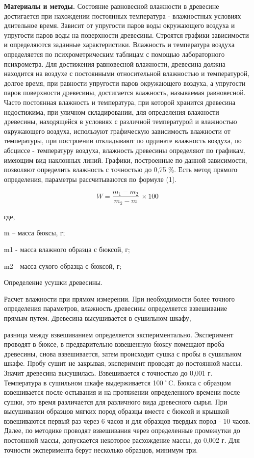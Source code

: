 \begin{multicols}{2}
{\bfseries Материалы и методы.} Состояние равновесной влажности в древесине
достигается при нахождении постоянных температура - влажностных условиях
длительное время. Зависит от упругости паров воды окружающего воздуха и
упругости паров воды на поверхности древесины. Строятся графики
зависимости и определяются заданные характеристики. Влажность и
температура воздуха определяется по психрометрическим таблицам с помощью
лабораторного психрометра. Для достижения равновесной влажности,
древесина должна находится на воздухе с постоянными относительной
влажностью и температурой, долгое время, при равности упругости паров
окружающего воздуха, а упругости паров поверхности древесины,
достигается влажность, называемая равновесной. Часто постоянная
влажность и температура, при которой хранится древесина недостижима, при
уличном складировании, для определения влажности древесины, находящейся
в условиях с различной температурой и влажностью окружающего воздуха,
используют графическую зависимость влажности от температуры, при
построении откладывают по ординате влажность воздуха, по абсциссе -
температуру воздуха, влажность древесины определяют по графикам, имеющим
вид наклонных линий. Графики, построенные по данной зависимости,
позволяют определить влажность с точностью до 0,75 \%. Есть метод
прямого определения, параметры рассчитываются по формуле (1).
\end{multicols}

\begin{equation}
W = \frac{m_{1} - m_{2}}{m_{2} - m}\  \times 100
\end{equation}

\begin{multicols}{2}
где,

m -- масса бюксы, г;

m1 - масса влажного образца с бюксой, г;

m2 - масса сухого образца с бюксой, г;

Определение усушки древесины.

Расчет влажности при прямом измерении. При необходимости более точного
определения параметров, влажность древесины определяется взвешивание
прямым путем. Древесина высушивается в сушильном шкафу,

разница между взвешиванием определяется экспериментально. Эксперимент
проводят в бюксе, в предварительно взвешенную бюксу помещают проба
древесины, снова взвешивается, затем происходит сушка с пробы в
сушильном шкафе. Пробу сушит не закрывая, эксперимент проводят до
постоянной массы. Значит древесина высушилась. Взвешивается с точностью
до 0,001 г. Температура в сушильном шкафе выдерживается 100˚C. Бюкса с
образцом взвешивается после остывания и на протяжении определенного
времени после сушки, это время различается для различного вида
древесного сырья. При высушивании образцов мягких пород образцы вместе с
бюксой и крышкой взвешиваются первый раз через 6 часов и для образцов
твердых пород - 10 часов. Далее, по методике проводят взвешивания через
определенные промежутки до постоянной массы, допускается некоторое
расхождение массы, до 0,002 г. Для точности эксперимента берут несколько
образцов, минимум три.
\end{multicols}

